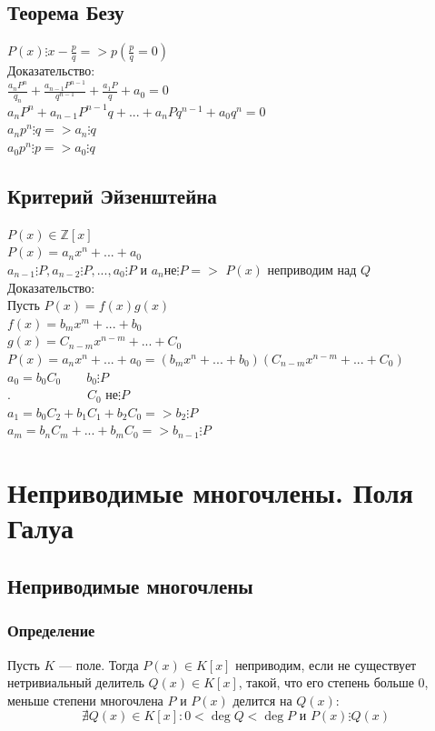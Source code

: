 \documentclass[12pt]{article}
\begin{document}
    \subsection{Теорема Безу}
    \noindent $P(x) \vdots x - \frac{p}{q} => p(\frac{p}{q} = 0)$
    \\Доказательство:
    \\$\frac{a_nP^n}{q_n}+\frac{a_{n-1}P^{n-1}}{q^{n-1}}+\frac{a_1P}{q}+a_0=0$
\\$a_nP^n+a_{n-1}P^{n-1}q+...+a_nPq^{n-1}+a_0q^n=0$
    \\$a_np^n \vdots q => a_n \vdots q$
\\$a_0p^n \vdots p => a_0 \vdots q$
    \subsection{Критерий Эйзенштейна}
    \noindent $P(x) \in \mathbb{Z}[x]$
    \\$P(x) = a_nx^n+...+a_0$
\\$a_{n-1}\vdots P, a_{n-2} \vdots P,...,a_0\vdots P$ и $a_n$не$\vdots P=>$ $P(x)$ неприводим над $Q$
    \\Доказательство:
    \\Пусть $P(x) = f(x)g(x)$
    \\$f(x) = b_mx^m+...+b_0$
\\$g(x) = C_{n-m}x^{n-m}+...+C_0$
    \\$P(x) = a_nx^n+...+a_0=(b_mx^n+...+b_0)(C_{n-m}x^{n-m}+...+C_0)$
\\$a_0=b_0C_0 \qquad b_0 \vdots P$
    \\$. \hspace{6em}C_0$ не$ \vdots P$
\\$a_1=b_0C_2+b_1C_1+b_2C_0 => b_2\vdots P $
    \\$a_m=b_nC_m+...+b_mC_0 => b_{n-1}\vdots P $

\setcounter{section}{12}
\section{Неприводимые многочлены. Поля Галуа}
\subsection{Неприводимые многочлены}
\subsubsection{Определение}
Пусть $K$ — поле. Тогда $P(x) \in K[x]$ неприводим, если не существует нетривиальный делитель $Q(x) \in K[x]$, такой, что его степень больше 0, меньше степени многочлена $P$ и $P(x)$ делится на $Q(x)$:
\[
    \nexists Q(x) \in K[x] : 0 < \deg Q < \deg P \text{ и } P(x) \vdots Q(x)
\]
\end{document}
